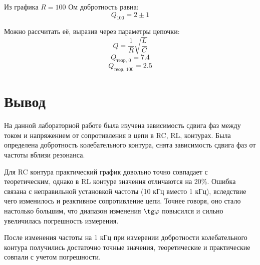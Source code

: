 \documentclass[a4paper, 12pt]{article}
\begin{document}
Из графика $R = 100$ Ом добротность равна:
$$Q_{100}=2 \pm1$$

Можно рассчитать её, выразив через параметры цепочки:
$$Q = \frac{1}{R} \sqrt{\frac{L}{C}}$$
$$Q_{\text{теор, 0}} = 7.4$$
$$Q_{\text{теор, 100}} = 2.5$$

\section{Вывод}

На данной лабораторной работе была изучена зависимость сдвига фаз между током и напряжением от сопротивления в цепи в RC, RL, контурах. Была определена добротность колебательного контура, снята зависимость сдвига фаз от частоты вблизи резонанса. 

Для RC контура практический график довольно точно совпадает с теоретическим, однако в RL контуре значения отличаются на 20\%. Ошибка связана с неправильной установкой частоты (10 кГц вместо 1 кГц), вследствие чего изменилось и реактивное сопротивление цепи. Точнее говоря, оно стало настолько большим, что диапазон изменения $\tg \varphi$ повысился и сильно увеличилась погрешность измерения.

После изменения частоты на 1 кГц при измерении добротности колебательного контура получились достаточно точные значения, теоретические и практические совпали с учетом погрешности.
\end{document}
